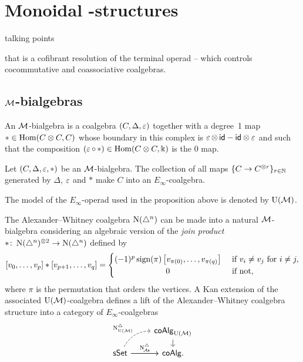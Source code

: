 
\section{Monoidal \pdfEinfty-structures}

talking points

that is a cofibrant resolution of the terminal operad -- which controls cocommutative and coassociative coalgebras.

\subsection{$\mathcal{M}$-bialgebras}

\begin{definition*}
	An $\mathcal{M}$-bialgebra is a coalgebra $(C, \Delta, \operatorname{\varepsilon})$ together with a degree~1 map $\ast \in \mathrm{Hom}(C \otimes C, C)$ whose boundary in this complex is $\operatorname{\varepsilon} \otimes \, \mathsf{id} - \mathsf{id} \otimes \operatorname{\varepsilon}$ and such that the composition $(\operatorname{\varepsilon} \circ \, \ast) \in \mathrm{Hom}(C \otimes C, \Bbbk)$ is the $0$ map.
\end{definition*}

\begin{proposition*}
	Let $(C, \Delta, \operatorname{\varepsilon}, \ast)$ be an $\mathcal{M}$-bialgebra.
	The collection of all maps $\{C \to C^{\otimes r}\}_{r \in \mathbb{N}}$ generated by $\Delta$, $\operatorname{\varepsilon}$ and $\ast$ make $C$ into an $E_\infty$-coalgebra.
\end{proposition*}

The model of the $E_\infty$-operad used in the proposition above is denoted by ${\operatorname{U}(\mathcal{M})}$.

\begin{example}\label{ex:simplicial e-infty}
	The Alexander--Whitney coalgebra $\operatorname{N}(\triangle^n)$ can be made into a natural $\mathcal{M}$-bialgebra considering an algebraic version of the \textit{join product} $\ast \colon \operatorname{N}(\triangle^n)^{\otimes 2} \to \operatorname{N}(\triangle^n)$ defined by
	\begin{equation*}
		\left[v_0, \dots, v_p \right] \ast \left[v_{p+1}, \dots, v_q\right] =
		\begin{cases} (-1)^{p} \sign(\pi) \left[v_{\pi(0)}, \dots, v_{\pi(q)}\right] &
			\text{ if } v_i \neq v_j \text{ for } i \neq j, \\
			\hfil 0 & \text{ if not},
		\end{cases}
	\end{equation*}
	where $\pi$ is the permutation that orders the vertices.
	A Kan extension of the associated ${\operatorname{U}(\mathcal{M})}$-coalgebra defines a lift of the Alexander--Whitney coalgebra structure into a category of $E_\infty$-coalgebras
	\begin{equation*}
		\begin{tikzcd}[column sep=normal, row sep=small]
			& \coAlg_{\UM} \arrow[d] \\
			\sSet \arrow[r]
			\arrow[ur,out=60, in=180, dashed, "\schainsUM"]
			\arrow[r, "\schainsA"]
			& \coAlg.
		\end{tikzcd}
	\end{equation*}
\end{example}

